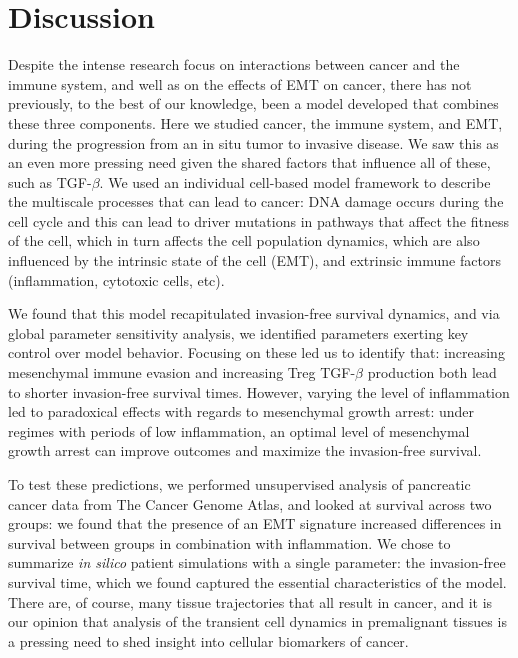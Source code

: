 \documentclass[11pt]{article}
\begin{document}
\section{Discussion}\label{Discussion}
Despite the intense research focus on interactions between cancer and the immune system, and well as on the effects of EMT on cancer, there has not previously, to the best of our knowledge, been a model developed that combines these three components. Here we studied cancer, the immune system, and EMT, during the progression from an in situ tumor to invasive disease. We saw this as an even more pressing need given the shared factors that influence all of these, such as TGF-$\beta$. We used an individual cell-based model framework to describe the multiscale processes that can lead to cancer: DNA damage occurs during the cell cycle and this can lead to driver mutations in pathways that affect the fitness of the cell, which in turn affects the cell population dynamics, which are also influenced by the intrinsic state of the cell (EMT), and extrinsic immune factors (inflammation, cytotoxic cells, etc).
\par
We found that this model recapitulated invasion-free survival dynamics, and via global parameter sensitivity analysis, we identified parameters exerting key control over model behavior. Focusing on these led us to identify that: increasing mesenchymal immune evasion and increasing Treg TGF-$\beta$ production both lead to shorter invasion-free survival times. However, varying the level of inflammation led to paradoxical effects with regards to mesenchymal growth arrest: under regimes with periods of low inflammation, an optimal level of mesenchymal growth arrest can improve outcomes and maximize the invasion-free survival.
\par
To test these predictions, we performed unsupervised analysis of pancreatic cancer data from The Cancer Genome Atlas, and looked at survival across two groups: we found that the presence of an EMT signature increased differences in survival between groups in combination with inflammation. We chose to summarize {\em in silico} patient simulations with a single parameter: the invasion-free survival time, which we found captured the essential characteristics of the model. There are, of course, many tissue trajectories that all result in cancer, and it is our opinion that analysis of the transient cell dynamics in premalignant tissues is a pressing need to shed insight into cellular biomarkers of cancer.
\par
\end{document}
